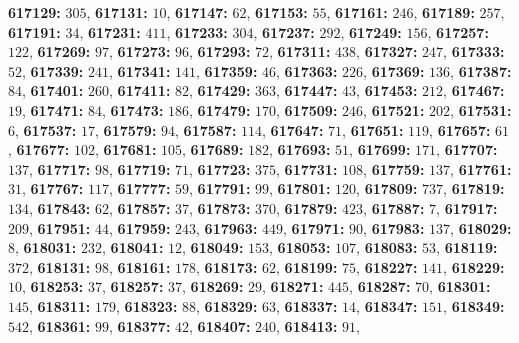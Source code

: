 \textsf{\bfseries 617129:} $305$, \textsf{\bfseries 617131:} $10$, \textsf{\bfseries 617147:} $62$, \textsf{\bfseries 617153:} $55$, \textsf{\bfseries 617161:} $246$, \textsf{\bfseries 617189:} $257$, \textsf{\bfseries 617191:} $34$, \textsf{\bfseries 617231:} $411$, \textsf{\bfseries 617233:} $304$, \textsf{\bfseries 617237:} $292$, \textsf{\bfseries 617249:} $156$, \textsf{\bfseries 617257:} $122$, \textsf{\bfseries 617269:} $97$, \textsf{\bfseries 617273:} $96$, \textsf{\bfseries 617293:} $72$, \textsf{\bfseries 617311:} $438$, \textsf{\bfseries 617327:} $247$, \textsf{\bfseries 617333:} $52$, \textsf{\bfseries 617339:} $241$, \textsf{\bfseries 617341:} $141$, \textsf{\bfseries 617359:} $46$, \textsf{\bfseries 617363:} $226$, \textsf{\bfseries 617369:} $136$, \textsf{\bfseries 617387:} $84$, \textsf{\bfseries 617401:} $260$, \textsf{\bfseries 617411:} $82$, \textsf{\bfseries 617429:} $363$, \textsf{\bfseries 617447:} $43$, \textsf{\bfseries 617453:} $212$, \textsf{\bfseries 617467:} $19$, \textsf{\bfseries 617471:} $84$, \textsf{\bfseries 617473:} $186$, \textsf{\bfseries 617479:} $170$, \textsf{\bfseries 617509:} $246$, \textsf{\bfseries 617521:} $202$, \textsf{\bfseries 617531:} $6$, \textsf{\bfseries 617537:} $17$, \textsf{\bfseries 617579:} $94$, \textsf{\bfseries 617587:} $114$, \textsf{\bfseries 617647:} $71$, \textsf{\bfseries 617651:} $119$, \textsf{\bfseries 617657:} $61$, \textsf{\bfseries 617677:} $102$, \textsf{\bfseries 617681:} $105$, \textsf{\bfseries 617689:} $182$, \textsf{\bfseries 617693:} $51$, \textsf{\bfseries 617699:} $171$, \textsf{\bfseries 617707:} $137$, \textsf{\bfseries 617717:} $98$, \textsf{\bfseries 617719:} $71$, \textsf{\bfseries 617723:} $375$, \textsf{\bfseries 617731:} $108$, \textsf{\bfseries 617759:} $137$, \textsf{\bfseries 617761:} $31$, \textsf{\bfseries 617767:} $117$, \textsf{\bfseries 617777:} $59$, \textsf{\bfseries 617791:} $99$, \textsf{\bfseries 617801:} $120$, \textsf{\bfseries 617809:} $737$, \textsf{\bfseries 617819:} $134$, \textsf{\bfseries 617843:} $62$, \textsf{\bfseries 617857:} $37$, \textsf{\bfseries 617873:} $370$, \textsf{\bfseries 617879:} $423$, \textsf{\bfseries 617887:} $7$, \textsf{\bfseries 617917:} $209$, \textsf{\bfseries 617951:} $44$, \textsf{\bfseries 617959:} $243$, \textsf{\bfseries 617963:} $449$, \textsf{\bfseries 617971:} $90$, \textsf{\bfseries 617983:} $137$, \textsf{\bfseries 618029:} $8$, \textsf{\bfseries 618031:} $232$, \textsf{\bfseries 618041:} $12$, \textsf{\bfseries 618049:} $153$, \textsf{\bfseries 618053:} $107$, \textsf{\bfseries 618083:} $53$, \textsf{\bfseries 618119:} $372$, \textsf{\bfseries 618131:} $98$, \textsf{\bfseries 618161:} $178$, \textsf{\bfseries 618173:} $62$, \textsf{\bfseries 618199:} $75$, \textsf{\bfseries 618227:} $141$, \textsf{\bfseries 618229:} $10$, \textsf{\bfseries 618253:} $37$, \textsf{\bfseries 618257:} $37$, \textsf{\bfseries 618269:} $29$, \textsf{\bfseries 618271:} $445$, \textsf{\bfseries 618287:} $70$, \textsf{\bfseries 618301:} $145$, \textsf{\bfseries 618311:} $179$, \textsf{\bfseries 618323:} $88$, \textsf{\bfseries 618329:} $63$, \textsf{\bfseries 618337:} $14$, \textsf{\bfseries 618347:} $151$, \textsf{\bfseries 618349:} $542$, \textsf{\bfseries 618361:} $99$, \textsf{\bfseries 618377:} $42$, \textsf{\bfseries 618407:} $240$, \textsf{\bfseries 618413:} $91$, 
